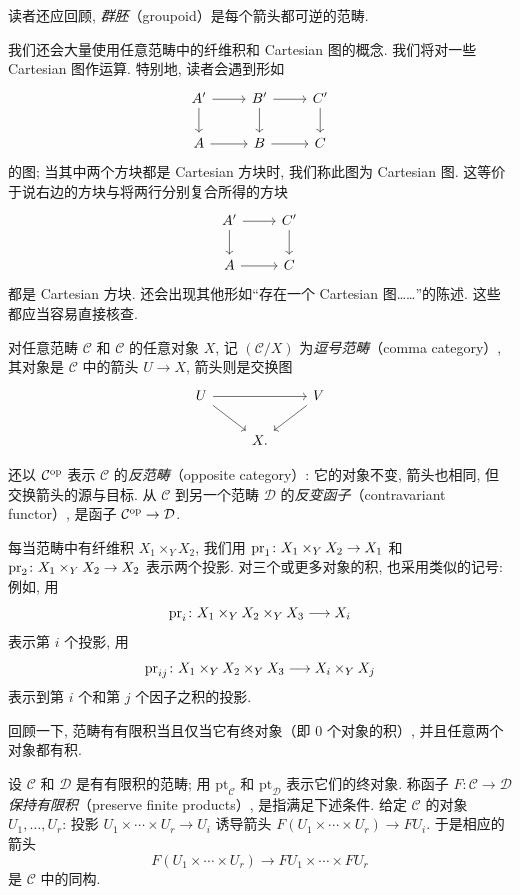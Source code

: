 读者还应回顾, \emph{群胚}（groupoid）是每个箭头都可逆的范畴.

我们还会大量使用任意范畴中的纤维积和 Cartesian 图的概念. 我们将对一些 Cartesian 图作运算. 特别地, 读者会遇到形如
\[\begin{tikzcd}A'\ar[r]\ar[d]&B'\ar[r]\ar[d]&C'\ar[d]\\A\ar[r]&B\ar[r]&C\end{tikzcd}\]
的图; 当其中两个方块都是 Cartesian 方块时, 我们称此图为 Cartesian 图. 这等价于说右边的方块与将两行分别复合所得的方块
\[\begin{tikzcd}A'\ar[r]\ar[d]&C'\ar[d]\\A\ar[r]&C\end{tikzcd}\]
都是 Cartesian 方块. 还会出现其他形如“存在一个 Cartesian 图……”的陈述. 这些都应当容易直接核查.

对任意范畴 $\mathcal C$ 和 $\mathcal C$ 的任意对象 $X$, 记 $(\mathcal C/X)$ 为\emph{逗号范畴}（comma category）, 其对象是 $\mathcal C$ 中的箭头 $U\to X$, 箭头则是交换图
\[\begin{tikzcd}U\ar[rr]\ar[dr]&&V\ar[dl]\\&X.&\end{tikzcd}\]

还以 $\mathcal C^{\mathrm{op}}$ 表示 $\mathcal C$ 的\emph{反范畴}（opposite category）: 它的对象不变, 箭头也相同, 但交换箭头的源与目标. 从 $\mathcal C$ 到另一个范畴 $\mathcal D$ 的\emph{反变函子}（contravariant functor）, 是函子 $\mathcal C^{\mathrm{op}}\to\mathcal D$.

每当范畴中有纤维积 $X_1\times_Y X_2$, 我们用 $\operatorname{pr}_1\colon X_1\times_Y X_2\to X_1$ 和 $\operatorname{pr}_2\colon X_1\times_Y X_2\to X_2$ 表示两个投影. 对三个或更多对象的积, 也采用类似的记号: 例如, 用
\[\operatorname{pr}_i\colon X_1\times_Y X_2\times_Y X_3\longrightarrow X_i\]
表示第 $i$ 个投影, 用
\[\operatorname{pr}_{ij}\colon X_1\times_Y X_2\times_Y X_3\longrightarrow X_i\times_Y X_j\]
表示到第 $i$ 个和第 $j$ 个因子之积的投影.

回顾一下, 范畴有有限积当且仅当它有终对象（即 $0$ 个对象的积）, 并且任意两个对象都有积.

设 $\mathcal C$ 和 $\mathcal D$ 是有有限积的范畴; 用 $\mathrm{pt}_{\mathcal C}$ 和 $\mathrm{pt}_{\mathcal D}$ 表示它们的终对象. 称函子 $F\colon\mathcal C\to\mathcal D$ \emph{保持有限积}（preserve finite products）, 是指满足下述条件. 给定 $\mathcal C$ 的对象 $U_1,\ldots,U_r$: 投影 $U_1\times\cdots\times U_r\to U_i$ 诱导箭头 $F(U_1\times\cdots\times U_r)\to FU_i$. 于是相应的箭头
\[F(U_1\times\cdots\times U_r)\longrightarrow FU_1\times\cdots\times FU_r\]
是 $\mathcal C$ 中的同构.

